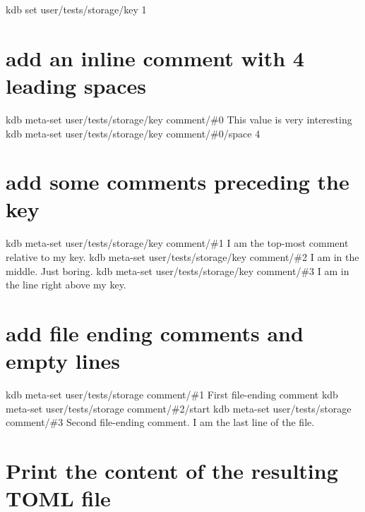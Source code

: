 kdb set \textquotesingle{}user/tests/storage/key\textquotesingle{} \textquotesingle{}1\textquotesingle{}\hypertarget{autotoc_md693_autotoc_md780}{}\section{add an inline comment with 4 leading spaces}\label{autotoc_md693_autotoc_md780}
kdb meta-\/set \textquotesingle{}user/tests/storage/key\textquotesingle{} \textquotesingle{}comment/\#0\textquotesingle{} \textquotesingle{} This value is very interesting\textquotesingle{} kdb meta-\/set \textquotesingle{}user/tests/storage/key\textquotesingle{} \textquotesingle{}comment/\#0/space\textquotesingle{} \textquotesingle{}4\textquotesingle{}\hypertarget{autotoc_md693_autotoc_md781}{}\section{add some comments preceding the key}\label{autotoc_md693_autotoc_md781}
kdb meta-\/set \textquotesingle{}user/tests/storage/key\textquotesingle{} \textquotesingle{}comment/\#1\textquotesingle{} \textquotesingle{} I am the top-\/most comment relative to my key.\textquotesingle{} kdb meta-\/set \textquotesingle{}user/tests/storage/key\textquotesingle{} \textquotesingle{}comment/\#2\textquotesingle{} \textquotesingle{} I am in the middle. Just boring.\textquotesingle{} kdb meta-\/set \textquotesingle{}user/tests/storage/key\textquotesingle{} \textquotesingle{}comment/\#3\textquotesingle{} \textquotesingle{} I am in the line right above my key.\textquotesingle{}\hypertarget{autotoc_md693_autotoc_md782}{}\section{add file ending comments and empty lines}\label{autotoc_md693_autotoc_md782}
kdb meta-\/set \textquotesingle{}user/tests/storage\textquotesingle{} \textquotesingle{}comment/\#1\textquotesingle{} \textquotesingle{} First file-\/ending comment\textquotesingle{} kdb meta-\/set \textquotesingle{}user/tests/storage\textquotesingle{} \textquotesingle{}comment/\#2/start\textquotesingle{} \textquotesingle{}\textquotesingle{} kdb meta-\/set \textquotesingle{}user/tests/storage\textquotesingle{} \textquotesingle{}comment/\#3\textquotesingle{} \textquotesingle{} Second file-\/ending comment. I am the last line of the file.\textquotesingle{}\hypertarget{autotoc_md693_autotoc_md783}{}\section{Print the content of the resulting T\+O\+M\+L file}\label{autotoc_md693_autotoc_md783}
